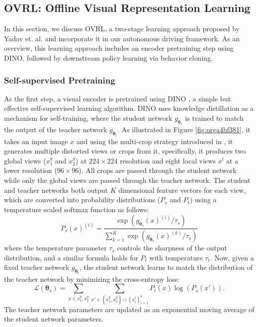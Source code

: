 \documentclass[letterpaper, 12pt]{book}
\theoremstyle{definition}
\theoremstyle{definition}
\theoremstyle{definition}
\theoremstyle{definition}
\theoremstyle{definition}
\newcommand{\vth}{\boldsymbol{\theta}}
\begin{document}
\subsection{OVRL: Offline Visual Representation Learning}
\label{sec:orgf5ff591}
In this section, we discuss OVRL\cite{Yadav2022}, a two-stage learning approach
proposed by Yadav et. al. and incorporate it in our autonomous driving
framework. As an overview, this learning approach includes an encoder
pretraining step using DINO, followed by downstream policy learning via behavior
cloning.
\subsubsection{Self-supervised Pretraining}
\label{sec:org5dac6c1}
As the first step, a visual encoder is pretrained using DINO \cite{Caron2021}, a
simple but effective self-supervised learning algorithm. DINO uses knowledge
distillation as a mechanism for self-training, where the student network
\(g_{\vth_{s}}\) is trained to match the output of the teacher network
\(g_{\vth_{t}}\).  As illustrated in Figure \ref{fig:orga4bf381}, it takes an input image
\(x\) and using the multi-crop strategy introduced in \cite{Caron2020}, it
generates multiple distorted views or crops from it, specifically, it produces
two global views (\(x_{1}^{g}\) and \(x_{2}^{g}\)) at \(224\times 224\) resolution
and eight local views \(x^{l}\) at a lower resolution (\(96\times 96\)). All crops
are passed through the student network while only the global views are passed
through the teacher network.  The student and teacher networks both output \(K\)
dimensional feature vectors for each view, which are converted into probability
distributions (\(P_{s}\) and \(P_{t}\)) using a temperature scaled softmax
function as follows:
\[P_{s}(x)^{(i)}=\frac{\exp\left( g_{\vth_{s}}(x)^{(i)}/\tau_{s} \right)}{\sum_{k=1}^{K}\exp\left( g_{\vth_{s}}(x)^{(k)}/\tau_{s} \right)}\]
where the temperature parameter \(\tau_{s}\) controls the sharpness of the output
distribution, and a similar formula holds for \(P_{t}\) with temperature
\(\tau_{t}\). Now, given a fixed teacher network \(g_{\vth_{t}}\), the student
network learns to match the distribution of the teacher network by minimizing
the cross-entropy loss:
\[\mathcal{L}(\vth_{s})=\sum_{x\in{x_{1}^{g},x_{2}^{g}}}\sum_{x'\in
\left\lbrace x_{1}^{g},x_{2}^{g} \right\rbrace\cup\left\lbrace x^{l}_{i} \right\rbrace_{i=1}^{8}}P_{t}(x)\log(P_{s}(x')).\] The
teacher network parameters are updated as an exponential moving average of the
student network parameters.
\end{document}
